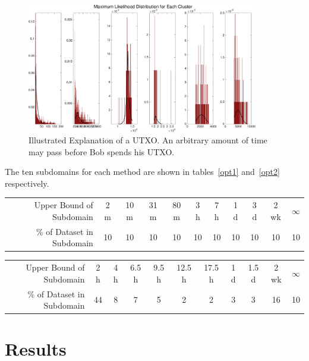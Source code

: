 \documentclass[12pt]{article}
\begin{document}
\begin{figure}
\begin{center}
\includegraphics[width=0.9\textwidth]{figures/fits}
\end{center}
\caption{Illustrated Explanation of a UTXO. An arbitrary amount of time may pass before Bob spends his UTXO.}
\label{fits}
\end{figure}

The ten subdomains for each method are shown in tables~\ref{opt1} and~\ref{opt2} respectively.

\begin{center}
\begin{tabular}{r||c|c|c|c|c|c|c|c|c|c}
Upper Bound of Subdomain & 2 m & 10 m & 31 m & 80 m & 3 h & 7 h & 1 d & 3 d & 2 wk & $\infty$\\
\% of Dataset in Subdomain & 10 & 10 & 10 & 10 & 10 & 10 & 10 & 10 & 10 & 10
\label{opt1}
\end{tabular}
\end{center}

\begin{center}
\begin{tabular}{r||c|c|c|c|c|c|c|c|c|c}
Upper Bound of Subdomain & 2 h & 4 h & 6.5 h & 9.5 h & 12.5 h & 17.5 h & 1 d & 1.5 d & 2 wk & $\infty$\\
\% of Dataset in Subdomain & 44 & 8 & 7 & 5 & 2 & 2 & 3 & 3 & 16 & 10
\label{opt2}
\end{tabular}
\end{center}


\section{Results}
\end{document}
